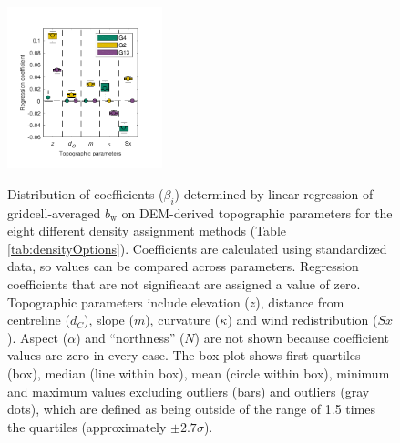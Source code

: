 \documentclass[twocolumn, letterpaper]{igs}
\begin{document}
\begin{figure}
	\centering
	\includegraphics[width =0.4\textwidth]{BetaCoeffs.pdf}\\
	\caption{Distribution of coefficients ($\beta_i$) determined by linear regression of gridcell-averaged $b_\mathrm{w}$ on DEM-derived topographic parameters for the eight different density assignment methods (Table \ref{tab:densityOptions}). Coefficients are calculated using standardized data, so values can be compared across parameters. Regression coefficients that are not significant are assigned a value of zero. Topographic parameters include elevation ($z$), distance from centreline ($d_C$), slope ($m$), curvature ($\kappa$) and wind redistribution ($Sx$).  Aspect ($\alpha$) and ``northness'' ($N$) are not shown because coefficient values are zero in every case. The box plot shows first quartiles (box), median (line within box), mean (circle within box), minimum and maximum values excluding outliers (bars) and outliers (gray dots), which are defined as being outside of the range of 1.5 times the quartiles (approximately $\pm2.7\sigma$). }
	\label{fig:BetaCoeffs}
\end{figure}
\end{document}
